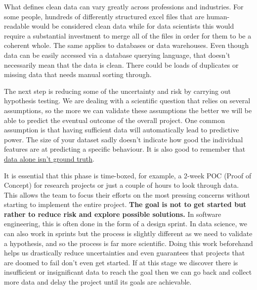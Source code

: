 \documentclass[
]{book}
\begin{document}
What defines clean data can vary greatly across professions and industries. For some people, hundreds of differently structured excel files that are human-readable would be considered clean data while for data scientists this would require a substantial investment to merge all of the files in order for them to be a coherent whole. The same applies to databases or data warehouses. Even though data can be easily accessed via a database querying language, that doesn't necessarily mean that the data is clean. There could be loads of duplicates or missing data that needs manual sorting through.

The next step is reducing some of the uncertainty and risk by carrying out hypothesis testing. We are dealing with a scientific question that relies on several assumptions, so the more we can validate these assumptions the better we will be able to predict the eventual outcome of the overall project. One common assumption is that having sufficient data will automatically lead to predictive power. The size of your dataset sadly doesn't indicate how good the individual features are at predicting a specific behaviour. It is also good to remember that \href{https://medium.com/@angebassa/data-alone-isnt-ground-truth-9e733079dfd4}{data alone isn't ground truth}.

It is essential that this phase is time-boxed, for example, a 2-week POC (Proof of Concept) for research projects or just a couple of hours to look through data. This allows the team to focus their efforts on the most pressing concerns without starting to implement the entire project. \textbf{The goal is not to get started but rather to reduce risk and explore possible solutions.} In software engineering, this is often done in the form of a design sprint. In data science, we can also work in sprints but the process is slightly different as we need to validate a hypothesis, and so the process is far more scientific. Doing this work beforehand helps us drastically reduce uncertainties and even guarantees that projects that are doomed to fail don't even get started. If at this stage we discover there is insufficient or insignificant data to reach the goal then we can go back and collect more data and delay the project until its goals are achievable.
\end{document}
